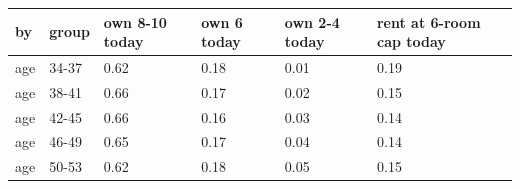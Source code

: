\begingroup\small
\setlength{\tabcolsep}{3pt}
\renewcommand{\arraystretch}{1.04}
\begin{tabularx}{\linewidth}{XXXXXX}
\toprule
by & group & own 8-10 today & own 6 today & own 2-4 today & rent at 6-room cap today \\
\midrule
age & 34-37 & 0.62 & 0.18 & 0.01 & 0.19 \\
age & 38-41 & 0.66 & 0.17 & 0.02 & 0.15 \\
age & 42-45 & 0.66 & 0.16 & 0.03 & 0.14 \\
age & 46-49 & 0.65 & 0.17 & 0.04 & 0.14 \\
age & 50-53 & 0.62 & 0.18 & 0.05 & 0.15 \\
\bottomrule
\end{tabularx}
\endgroup
